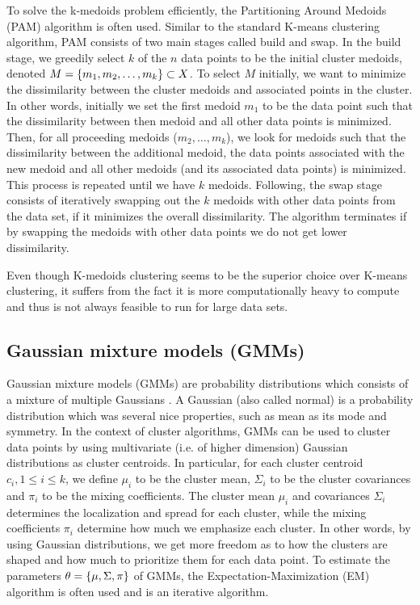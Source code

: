 To solve the k-medoids problem efficiently, the Partitioning Around Medoids (PAM) algorithm is often used. Similar to the standard K-means clustering algorithm, PAM consists of two main stages called build and swap. In the build stage, we greedily select $k$ of the $n$ data points to be the initial cluster medoids, denoted $M = \left\{m_1, m_2, \ldots, m_k\right\} \subset X$. To select $M$ initially, we want to minimize the dissimilarity between the cluster medoids and associated points in the cluster. In other words, initially we set the first medoid $m_1$ to be the data point such that the dissimilarity between then medoid and all other data points is minimized. Then, for all proceeding medoids ($m_2, \ldots, m_k$), we look for medoids such that the dissimilarity between the additional medoid, the data points associated with the new medoid and all other medoids (and its associated data points) is minimized. This process is repeated until we have $k$ medoids. Following, the swap stage consists of iteratively swapping out the $k$ medoids with other data points from the data set, if it minimizes the overall dissimilarity. The algorithm terminates if by swapping the medoids with other data points we do not get lower dissimilarity.

Even though K-medoids clustering seems to be the superior choice over K-means clustering, it suffers from the fact it is more computationally heavy to compute and thus is not always feasible to run for large data sets.

\subsection{Gaussian mixture models (GMMs)}
\label{sec:gmm-clustering}
Gaussian mixture models (GMMs) are probability distributions which consists of a mixture of multiple Gaussians \cite[Section 9.2]{bishop2006}. A Gaussian (also called normal) is a probability distribution which was several nice properties, such as mean as its mode and symmetry. In the context of cluster algorithms, GMMs can be used to cluster data points by using multivariate (i.e. of higher dimension) Gaussian distributions as cluster centroids. In particular, for each cluster centroid $c_i, 1 \leq i \leq k$, we define $\mu_i$ to be the cluster mean, $\Sigma_i$ to be the cluster covariances and $\pi_i$ to be the mixing coefficients. The cluster mean $\mu_i$ and covariances $\Sigma_i$ determines the localization and spread for each cluster, while the mixing coefficients $\pi_i$ determine how much we emphasize each cluster. In other words, by using Gaussian distributions, we get more freedom as to how the clusters are shaped and how much to prioritize them for each data point. To estimate the parameters $\theta = \left\{\mu, \Sigma, \pi\right\}$ of GMMs, the Expectation-Maximization (EM) algorithm is often used and is an iterative algorithm.

